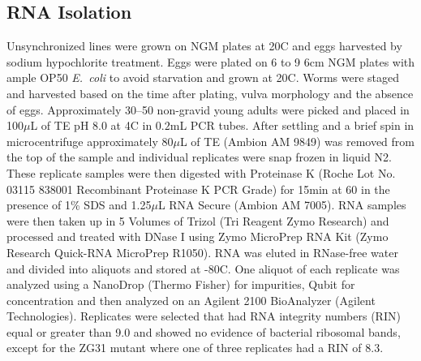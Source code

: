 \documentclass[10pt, onecolumn]{article}
\newcommand{\ecol}{\emph{E.~coli}}
\begin{document}
\subsection*{RNA Isolation}
Unsynchronized lines were grown on NGM plates at 20C and eggs harvested by
sodium hypochlorite treatment. Eggs were plated on 6 to 9 6cm NGM plates
with ample OP50 \ecol{} to avoid starvation and grown at
20\degree{}C.  Worms were staged and harvested based on the time after plating,
vulva morphology and the absence of eggs.  Approximately 30--50 non-gravid young
adults were picked and placed in 100$\mu$L of TE pH 8.0 at 4\degree{}C in
$0.2$mL PCR tubes.   After settling and a brief spin in microcentrifuge
approximately $80\mu$L of TE (Ambion AM 9849) was removed from the top of the
sample and individual replicates
were snap frozen in liquid N2. These replicate samples were then digested with
Proteinase K (Roche Lot No. 03115 838001 Recombinant Proteinase K PCR Grade) for
15min at 60\degree{} in the presence of 1\% SDS and 1.25$\mu$L
RNA Secure (Ambion AM 7005). RNA samples were then taken up in 5 Volumes of
Trizol (Tri Reagent Zymo Research) and processed and treated with DNase I using
Zymo MicroPrep RNA Kit (Zymo Research Quick-RNA MicroPrep R1050).
RNA was eluted in RNase-free water and divided into aliquots and stored at
-80\degree{}C. One aliquot of each replicate was analyzed using a NanoDrop (Thermo
Fisher) for impurities, Qubit for concentration and then analyzed on an Agilent
2100 BioAnalyzer (Agilent Technologies).
Replicates were selected that had RNA integrity numbers (RIN) equal or greater
than 9.0 and showed no evidence of bacterial ribosomal bands, except for the
ZG31 mutant where one of three replicates had a RIN of 8.3.
\end{document}
